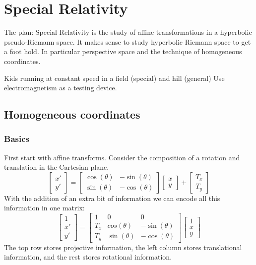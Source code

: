 
\section{Special Relativity}
The plan:
Special Relativity is the study of affine transformations in a hyperbolic pseudo-Riemann space.
It makes sense to study hyperbolic Riemann space to get a foot hold.
In particular perspective space and the technique of homogeneous coordinates. 

Kids running at constant speed in a field (special) and hill (general)
Use electromagnetism as a testing device.

\subsection{Homogeneous coordinates}
\subsubsection{Basics}
First start with affine transforms.
Consider the composition of a rotation and translation in the Cartesian plane.
\[\begin{bmatrix} x'\\y' \end{bmatrix} = \begin{bmatrix}\cos(\theta) & -\sin(\theta)\\ \sin(\theta) & -\cos(\theta)\end{bmatrix}
	\begin{bmatrix} x\\ y\end{bmatrix}+ \begin{bmatrix}T_x\\T_y\end{bmatrix}\]
With the addition of an extra bit of information we can encode all this information in one matrix:
\[\begin{bmatrix} 1\\x'\\y' \end{bmatrix} = \begin{bmatrix}1&0&0 \\ T_x & cos(\theta) & -\sin(\theta) \\ T_y & \sin(\theta) & -\cos(\theta) \end{bmatrix}
\begin{bmatrix} 1\\x\\y \end{bmatrix}
\]
The top row stores projective information, the left column stores translational information, and the rest stores rotational information.

